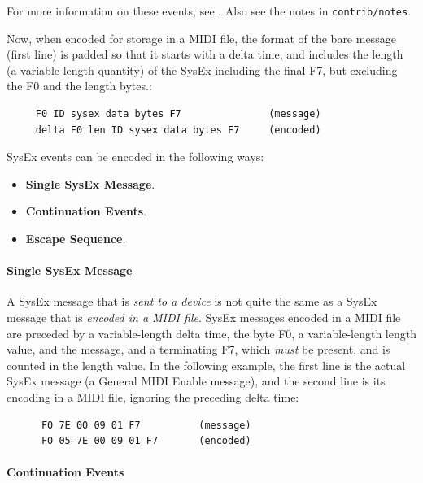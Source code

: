    For more information on these events, see
   .
   Also see the notes in \texttt{contrib/notes}.

   Now, when encoded for storage in a MIDI file, the format of the bare message
   (first line) is padded so that it starts with a delta time, and includes the
   length (a variable-length quantity) of the SysEx including the final F7, but
   excluding the F0 and the length bytes.:

   \begin{verbatim}
     F0 ID sysex data bytes F7               (message)
     delta F0 len ID sysex data bytes F7     (encoded)
   \end{verbatim}

   SysEx events can be encoded in the following ways:

   \begin{itemize}
      \item \textbf{Single SysEx Message}.
      \item \textbf{Continuation Events}.
      \item \textbf{Escape Sequence}.
   \end{itemize}

\paragraph{Single SysEx Message}
\label{paragraph:patterns_single_sysex_message}

   A SysEx message that is \textsl{sent to a device} is not quite the 
   same as a SysEx message that is \textsl{encoded in a MIDI file}.
   SysEx messages encoded in a MIDI file
   are preceded by a variable-length delta time, the byte F0,
   a variable-length length value, and the message, and a terminating F7,
   which \textsl{must} be present, and is counted in the length value.
   In the following example, the first line is the actual SysEx message
   (a General MIDI Enable message),
   and the second line is its encoding in a MIDI file, ignoring the preceding
   delta time:

   \begin{verbatim}
      F0 7E 00 09 01 F7          (message)
      F0 05 7E 00 09 01 F7       (encoded)
   \end{verbatim}

\paragraph{Continuation Events}
\label{paragraph:patterns_continuation_events}

